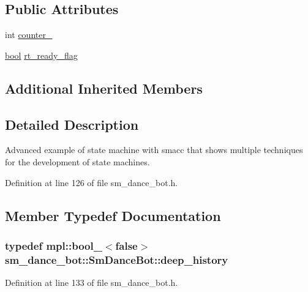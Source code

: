 \subsection*{Public Attributes}
\begin{DoxyCompactItemize}
\item 
int \hyperlink{structsm__dance__bot_1_1SmDanceBot_ab3b8db557ce94d34c60b291911eb140c}{counter\+\_}
\item 
\hyperlink{classbool}{bool} \hyperlink{structsm__dance__bot_1_1SmDanceBot_a0f0587a13670ad8925555cd8f6cb6b2d}{rt\+\_\+ready\+\_\+flag}
\end{DoxyCompactItemize}
\subsection*{Additional Inherited Members}


\subsection{Detailed Description}
Advanced example of state machine with smacc that shows multiple techniques for the development of state machines. 

Definition at line 126 of file sm\+\_\+dance\+\_\+bot.\+h.



\subsection{Member Typedef Documentation}
\subsubsection[{\texorpdfstring{deep\+\_\+history}{deep_history}}]{\setlength{\rightskip}{0pt plus 5cm}typedef mpl\+::bool\+\_\+$<$false$>$ {\bf sm\+\_\+dance\+\_\+bot\+::\+Sm\+Dance\+Bot\+::deep\+\_\+history}}\hypertarget{structsm__dance__bot_1_1SmDanceBot_abd58ec4a2b50a45da304a5f0b9c44706}{}\label{structsm__dance__bot_1_1SmDanceBot_abd58ec4a2b50a45da304a5f0b9c44706}


Definition at line 133 of file sm\+\_\+dance\+\_\+bot.\+h.

